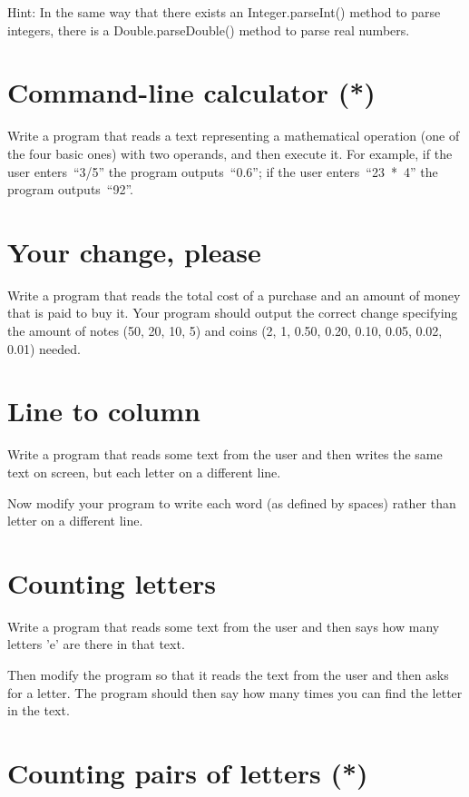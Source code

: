 \documentclass{article}
\begin{document}
Hint: In the same way that there exists an Integer.parseInt() method
to parse integers, there is a Double.parseDouble() method to parse
real numbers. 

\section{Command-line calculator (*)}
\label{sec:comm-line-calc}

Write a program that reads a text representing a mathematical
operation (one of the four basic ones) with two operands, and then
execute it. For example, if the user enters~``3/5'' the program
outputs~``0.6''; if the user enters~``23~*~4'' the program
outputs~``92''.

\section{Your change, please}
\label{sec:your-change-please}

Write a program that reads the total cost of a purchase and an amount
of money that is paid to buy it. Your program should output the
correct change specifying the amount of notes (50, 20, 10, 5) and
coins (2, 1, 0.50, 0.20, 0.10, 0.05, 0.02, 0.01) needed. 

\section{Line to column}
\label{sec:line-column}

Write a program that reads some text from the user and then writes the
same text on screen, but each letter on a different line. 

Now modify your program to write each word (as defined by spaces)
rather than letter on a different line. 

\section{Counting letters}
\label{sec:counting-letters}

Write a program that reads some text from the user and then says how
many letters 'e' are there in that text. 

Then modify the program so that it reads the text from the user and
then asks for a letter. The program should then say how many times you
can find the letter in the text. 

\section{Counting pairs of letters (*)}
\label{sec:count-pairs-lett}
\end{document}
